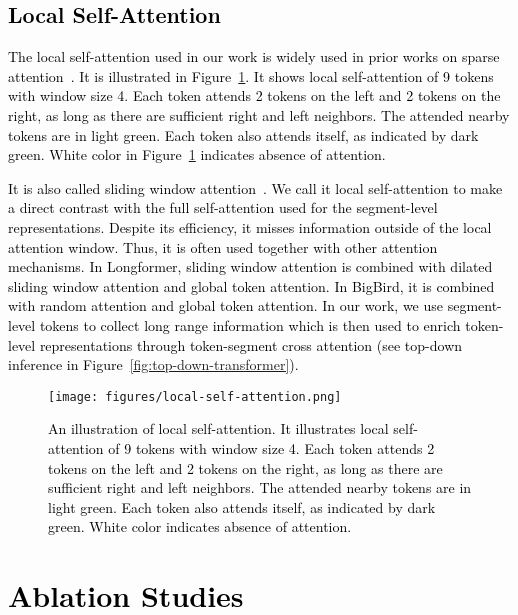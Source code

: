 \documentclass{article} \usepackage{iclr2022_conference,times}
\begin{document}
\subsection{\textcolor{black}{Local Self-Attention}}
\label{sec:supp-local-self-attn}
\textcolor{black}{The local self-attention used in our work is widely used in prior works on sparse attention~\citep{beltagy2020longformer, zaheer2020big}. It is illustrated in Figure~\ref{fig:local-self-attention}. It shows local self-attention of 9 tokens with window size 4. Each token attends 2 tokens on the left and 2 tokens on the right, as long as there are sufficient right and left neighbors. The attended nearby tokens are in light green. Each token also attends itself, as indicated by dark green. White color in Figure~\ref{fig:local-self-attention} indicates absence of attention.}

\textcolor{black}{It is also called sliding window attention~\citep{beltagy2020longformer}. We call it local self-attention to make a direct contrast with the full self-attention used for the segment-level representations. Despite its efficiency, it misses information outside of the local attention window. Thus, it is often used together with other attention mechanisms. In Longformer, sliding window attention is combined with dilated sliding window attention and global token attention. In BigBird, it is combined with random attention and global token attention. In our work, we use segment-level tokens to collect long range information which is then used to enrich token-level representations through token-segment cross attention (see top-down inference in Figure~\ref{fig:top-down-transformer}). }

\begin{figure}[!htbp]
    \centering
    \texttt{[image: figures/local-self-attention.png]}
    \caption{\footnotesize \textcolor{black}{An illustration of local self-attention. It illustrates local self-attention of 9 tokens with window size 4. Each token attends 2 tokens on the left and 2 tokens on the right, as long as there are sufficient right and left neighbors. The attended nearby tokens are in light green. Each token also attends itself, as indicated by dark green. White color indicates absence of attention.} }
    \label{fig:local-self-attention}
\end{figure}


\clearpage
\section{\textcolor{black}{Ablation Studies}}
\end{document}
